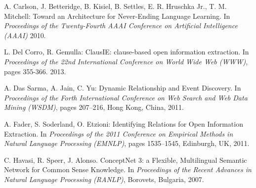 \documentclass[11pt,a4paper]{article}
\begin{document}
\begin{thebibliography}{99}
		 
 A. Carlson, J. Betteridge, B. Kisiel, B. Settles, E. R. Hruschka Jr., T. M. Mitchell: Toward an Architecture for Never-Ending Language Learning.  In \textit{Proceedings of the Twenty-Fourth AAAI Conference on Artificial Intelligence (AAAI)} 2010.

 L. Del Corro, R. Gemulla: ClausIE: clause-based open information extraction. In \textit{Proceedings  of the 22nd International Conference on World Wide Web (WWW)}, pages 355-366. 2013.

%

 A. Das Sarma, A. Jain, C. Yu: Dynamic Relationship and Event Discovery.  In \textit{Proceedings of the Forth International Conference on Web Search and Web Data Mining (WSDM)}, pages 207--216, Hong Kong, China, 2011.

 A. Fader, S. Soderland, O. Etzioni: Identifying Relations for Open Information Extraction. In \textit{Proceedings of the 2011 Conference on Empirical Methods in Natural Language Processing (EMNLP)}, pages 1535--1545, Edinburgh, UK, 2011.
%               		 
%	
	
 C. Havasi, R. Speer,  J. Alonso. ConceptNet 3: a Flexible, Multilingual Semantic Network for Common Sense Knowledge.  In \textit{Proceedings of the Recent Advances in Natural Language Processing (RANLP)}, Borovets, Bulgaria, 2007.
	
%	 


\end{thebibliography}
\end{document}
